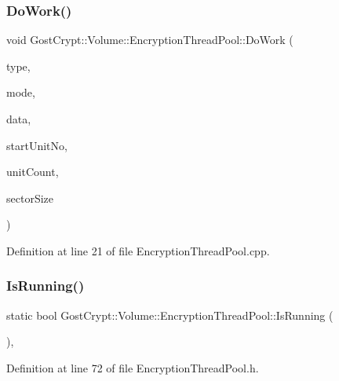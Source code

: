\subsubsection{\texorpdfstring{Do\+Work()}{DoWork()}}
{\footnotesize\ttfamily void Gost\+Crypt\+::\+Volume\+::\+Encryption\+Thread\+Pool\+::\+Do\+Work (\begin{DoxyParamCaption}\item[{\hyperlink{struct_gost_crypt_1_1_volume_1_1_encryption_thread_pool_1_1_work_type_ae8c867a2b992c79f01dcc50bab7a448e}{Work\+Type\+::\+Enum}}]{type,  }\item[{const \hyperlink{class_gost_crypt_1_1_volume_1_1_encryption_mode}{Encryption\+Mode} $\ast$}]{mode,  }\item[{quint8 $\ast$}]{data,  }\item[{quint64}]{start\+Unit\+No,  }\item[{quint64}]{unit\+Count,  }\item[{size\+\_\+t}]{sector\+Size }\end{DoxyParamCaption})\hspace{0.3cm}{\ttfamily [static]}}



Definition at line 21 of file Encryption\+Thread\+Pool.\+cpp.

\mbox{\label{class_gost_crypt_1_1_volume_1_1_encryption_thread_pool_a5295b2054e21724860f86540538d670d}} 
\subsubsection{\texorpdfstring{Is\+Running()}{IsRunning()}}
{\footnotesize\ttfamily static bool Gost\+Crypt\+::\+Volume\+::\+Encryption\+Thread\+Pool\+::\+Is\+Running (\begin{DoxyParamCaption}{ }\end{DoxyParamCaption})\hspace{0.3cm}{\ttfamily [inline]}, {\ttfamily [static]}}



Definition at line 72 of file Encryption\+Thread\+Pool.\+h.

\mbox{\label{class_gost_crypt_1_1_volume_1_1_encryption_thread_pool_a4999a63b3d84378641a5b5c89c1263dc}} 
